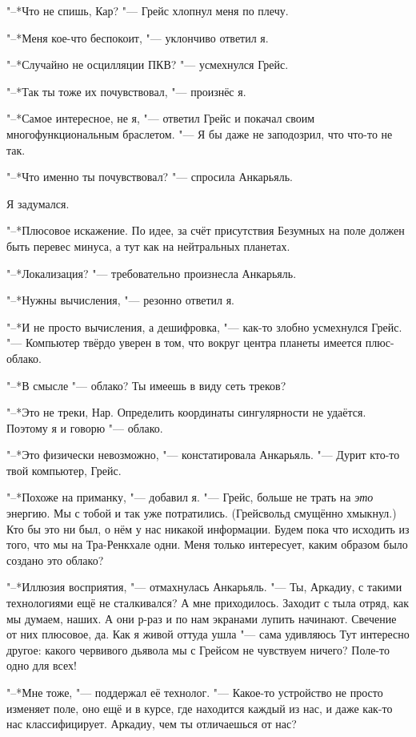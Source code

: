 \documentclass[a4paper,10pt]{book}
\newcommand{\ldotst}{\so{...}\xspace}
\begin{document}
"--*Что не спишь, Кар? "--- Грейс хлопнул меня по плечу.

"--*Меня кое-что беспокоит, "--- уклончиво ответил я.

"--*Случайно не осцилляции ПКВ? "--- усмехнулся Грейс.

"--*Так ты тоже их почувствовал, "--- произнёс я.

"--*Самое интересное, не я, "--- ответил Грейс и покачал своим 
многофункциональным браслетом. "--- Я бы даже не заподозрил, что что-то не так.

"--*Что именно ты почувствовал? "--- спросила Анкарьяль.

Я задумался.

"--*Плюсовое искажение. По идее, за счёт присутствия Безумных на поле должен 
быть 
перевес минуса, а тут\ldotst как на нейтральных планетах.

"--*Локализация? "--- требовательно произнесла Анкарьяль.

"--*Нужны вычисления, "--- резонно ответил я.

"--*И не просто вычисления, а дешифровка, "--- как-то злобно усмехнулся Грейс. 
"--- Компьютер твёрдо уверен в том, что вокруг центра планеты имеется 
плюс-облако.

"--*В смысле "--- облако? Ты имеешь в виду сеть треков?

"--*Это не треки, Нар. Определить координаты сингулярности не удаётся. Поэтому 
я и говорю "--- облако.

"--*Это физически невозможно, "--- констатировала Анкарьяль. "--- Дурит кто-то 
твой компьютер, Грейс.

"--*Похоже на приманку, "--- добавил я. "--- Грейс, больше не трать на 
\textit{это} энергию. Мы с тобой и так уже\ldotst потратились.  (Грейсвольд 
смущённо 
хмыкнул.) Кто бы это ни был, о нём у нас никакой информации. Будем пока что 
исходить из того, что мы на Тра-Ренкхале одни. Меня только интересует, каким 
образом было создано это облако?

"--*Иллюзия восприятия, "--- отмахнулась Анкарьяль. "--- Ты, Аркадиу, с такими 
технологиями ещё не сталкивался? А мне приходилось. Заходит с тыла отряд, как 
мы думаем, наших. А они р-раз и по нам экранами лупить начинают. Свечение от 
них плюсовое, да. Как я живой оттуда ушла "--- сама удивляюсь\ldotst Тут 
интересно другое: какого червивого дьявола мы с Грейсом не чувствуем ничего? 
Поле-то одно для всех!

"--*Мне тоже, "--- поддержал её технолог. "--- Какое-то 
устройство не просто изменяет поле, оно ещё и в курсе, где находится каждый из 
нас, и даже как-то нас классифицирует. Аркадиу, чем ты отличаешься от нас?
\end{document}
